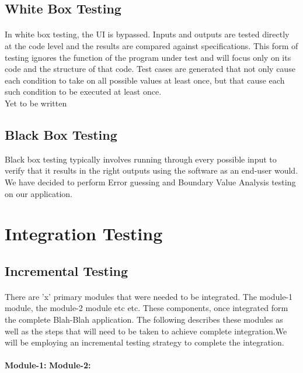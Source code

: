 \documentclass[a4paper,10pt]{scrreprt}
\begin{document}
\subsection{White Box Testing}
\paragraph{}
In white box testing, the UI is bypassed. Inputs and outputs are tested directly at the code level and the results are compared against specifications. This form of testing ignores the function of the program under test and will focus only on its code and the structure of that code. Test cases are generated that not only cause each condition to take on all possible values at least once, but that cause each such condition to be executed at least once.
\\
Yet to be written
\\
\subsection{Black Box Testing}
Black box testing typically involves running through every possible input to verify that it results in the right outputs using the software as an end-user would. We have decided to perform Error guessing and Boundary Value Analysis testing on our application.
\section{Integration Testing}
\subsection{Incremental Testing}
\paragraph{}
There are 'x' primary modules that were needed to be integrated. The module-1 module, the module-2 module etc etc. These components, once integrated form the complete Blah-Blah application. The following describes these modules as well as the steps that will need to be taken to achieve complete integration.We will be employing an incremental testing strategy to complete the integration.
\paragraph{}
\textbf{Module-1:}
\textbf{Module-2:}
\\
\\
\end{document}
